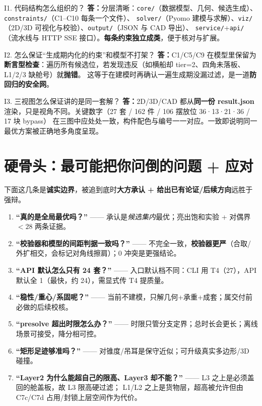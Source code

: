 \documentclass[11pt]{ctexart}
\newcommand{\code}[1]{\texttt{#1}}
\newcommand{\A}{\textbf{答：}}
\begin{document}
\begin{qa}{I1. 代码结构怎么组织的？}
\A 分层清晰：\code{core/}（数据模型、几何、候选生成）、\code{constraints/}（C1--C10 每条一个文件）、
\code{solver/}（Pyomo 建模与求解）、\code{viz/}（2D/3D 可视化与校验）、\code{output/}（JSON 与 CAD 导出）、
\code{service/}+\code{api/}（流水线与 HTTP SSE 接口）。\textbf{每条约束独立成类}，便于核对与扩展。
\end{qa}

\begin{qa}{I2. 怎么保证“生成期内化的约束”和模型不打架？}
\A C1/C5/C9 在模型里保留为\textbf{断言型检查}：遍历所有候选位，若发现违反（如横船却 tier=2、四角未落板、L1/2/3 缺舱号）就\textbf{抛错}。
这等于在建模时再确认一遍生成期没漏过滤，是一道\textbf{防回归的安全网}。
\end{qa}

\begin{qa}{I3. 三视图怎么保证讲的是同一套解？}
\A 2D/3D/CAD 都从\textbf{同一份 result.json} 渲染，只是视角不同。关键数字（27 套 / 162 件 / 106 摆放位 36·13·21·36 / 17 块 bypass）
在三图中应处处一致，构件配色与编号一一对应。一致即说明同一最优方案被正确地多角度呈现。
\end{qa}

\section{硬骨头：最可能把你问倒的问题 + 应对}
\begin{warn}
下面这几条是\textbf{诚实边界}，被追到底时\textbf{大方承认 + 给出已有论证/后续方向}远胜于强辩。
\begin{enumerate}[leftmargin=1.6em,itemsep=3pt]
  \item \textbf{“真的是全局最优吗？”} —— 承认是\emph{候选集内}最优；亮出饱和实验 + 对偶界 $<28$ 两条证据。
  \item \textbf{“校验器和模型的间距判据一致吗？”} —— 不完全一致，\textbf{校验器更严}（合取/外扩相交，会标记对角线擦肩）；0 冲突是更强结论。
  \item \textbf{“API 默认怎么只有 24 套？”} —— 入口默认档不同：CLI 用 T4（27），API 默认全 1（最快，约 24），需显式传 T4 提质量。
  \item \textbf{“稳性/重心/系固呢？”} —— 当前不建模，只解几何+承重+成套；属交付前必做的后续校核。
  \item \textbf{“presolve 超出时限怎么办？”} —— 时限只管分支定界；总时长会更长；离线场景可接受，降分相可控。
  \item \textbf{“矩形足迹够准吗？”} —— 对锥度/吊耳是保守近似；可升级真实多边形/3D 碰撞。
  \item \textbf{“Layer2 为什么能超自己的限高、Layer3 却不能？”} —— L3 之上是必须盖回的舱盖板，故 L3 限高硬过滤；
        L1/L2 之上是货物层，超高被允许但由 C7c/C7d 占用/封锁上层空间作为代价。
\end{enumerate}
\end{warn}
\end{document}

